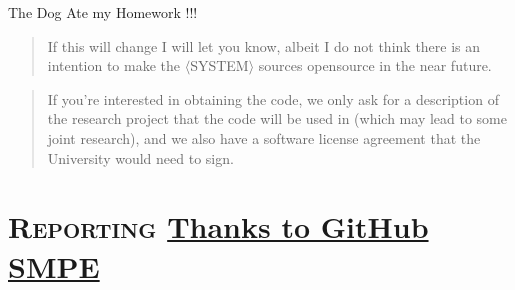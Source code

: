 \documentclass[11pt,xcolor=dvipsnames]{beamer}
\begin{document}
\begin{frame}[label=sec-1-0-4]{The Dog Ate my Homework !!! }
\begin{block}{}
\begin{overlayarea}{\linewidth}{5cm}
{\begin{quote}
          If this will change I will let you know, albeit I do not
          think there is an intention to make the
          $\langle$SYSTEM$\rangle$ sources opensource in the near
          future.
        \end{quote}
        \begin{quote}
          If you're interested in obtaining the code, \alert{we only ask
            for a description of the research project} that the code
          will be used in (\alert{which may lead to some joint
            research}), and we also have a software license agreement
          that the University would need to sign.
        \end{quote}}
    \end{overlayarea}
  \end{block}
  \null\vspace{-.4cm}
\end{frame}
\section[{\scshape Reporting}]{{\scshape Reporting} \href{https://github.com/alegrand/SMPE}{Thanks to GitHub SMPE} }
 
\label{sec-3}
\end{document}
